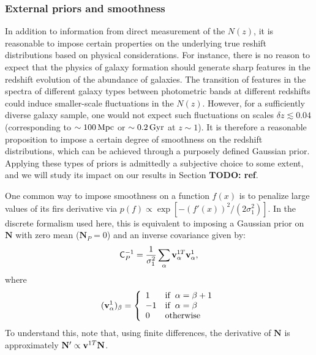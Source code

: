 \documentclass[a4paper,11pt]{article}
\newcommand{\todo}[1]{{\bf TODO: #1}}
\newcommand{\vN}{\mathbf{N}}
\begin{document}
    \subsubsection{External priors and smoothness}\label{sssec:theory.prior.smooth}
      In addition to information from direct measurement of the $N(z)$, it is reasonable to impose certain properties on the underlying true reshift distributions based on physical considerations. For instance, there is no reason to expect that the physics of galaxy formation should generate sharp features in the redshift evolution of the abundance of galaxies. The transition of features in the spectra of different galaxy types between photometric bands at different redshifts could induce smaller-scale fluctuations in the $N(z)$. However, for a sufficiently diverse galaxy sample, one would not expect such fluctuations on scales $\delta z\lesssim0.04$ (corresponding to $\sim100\,{\rm Mpc}$ or $\sim0.2\,{\rm Gyr}$ at $z\sim1$). It is therefore a reasonable proposition to impose a certain degree of smoothness on the redshift distributions, which can be achieved through a purposely defined Gaussian prior. Applying these types of priors is admittedly a subjective choice to some extent, and we will study its impact on our results in Section \todo{ref}.
      
      One common way to impose smoothness on a function $f(x)$ is to penalize large values of its firs derivative via $p(f)\propto\exp\left[-(f'(x))^2/(2\sigma_1^2)\right]$. In the discrete formalism used here, this is equivalent to imposing a Gaussian prior on $\vN$ with zero mean ($\vN_P=0$) and an inverse covariance given by:
      \begin{equation}\label{eq:prior_1st}
        {\sf C}^{-1}_P=\frac{1}{\sigma_1^2}\sum_\alpha {\bf v}^{1T}_\alpha{\bf v}^1_\alpha,
      \end{equation}
      where
      \begin{equation}
        ({\bf v}^1_\alpha)_\beta=\left\{
        \begin{array}{ll}
          1  & {\rm if}\,\,\, \alpha=\beta+1\\
          -1  &  {\rm if}\,\,\, \alpha=\beta\\
          0 & {\rm otherwise}
        \end{array}\right.
      \end{equation}
      To understand this, note that, using finite differences, the derivative of $\vN$ is approximately $\vN'\propto {\bf v}^{1T}\vN$.
\end{document}
